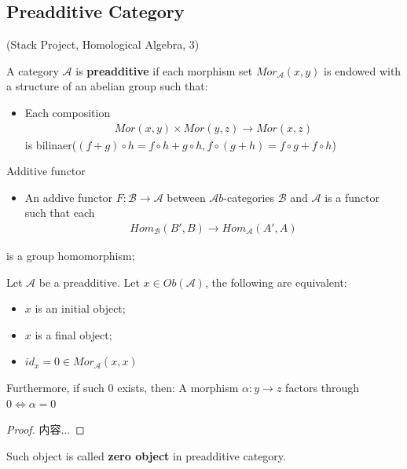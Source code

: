 \documentclass[Total.tex]{subfiles}
\begin{document}
			\subsection{Preadditive Category}
				(Stack Project, Homological Algebra, 3)
				\begin{Def}
					A category $\mathcal{A}$ is \textbf{preadditive} if each morphism set $Mor_\mathcal{A}(x,y)$ is endowed with a structure of an abelian group such that:
					\begin{itemize}
						\item  Each composition
						\begin{gather*}
							Mor(x,y)\times Mor(y,z)\rightarrow Mor(x,z)
						\end{gather*}
						is bilinaer($(f+g)\circ h=f\circ h+g\circ h,f\circ (g+h)=f\circ g+f\circ h$)
					\end{itemize}
				\end{Def}
				Additive functor
				\begin{Def}
					\begin{itemize}
						\item An addive functor $F:\mathcal{B}\rightarrow \mathcal{A}$ between $\mathcal Ab$-categories $\mathcal{B}$ and $\mathcal{A}$ is a functor such that each
						\begin{gather*}
							Hom_\mathcal{B}(B',B)\rightarrow Hom_{\mathcal{A}}(A',A)
						\end{gather*}
					\end{itemize}
					is a group homomorphism;
				\end{Def}
				\begin{lemma}
					Let $\mathcal{A}$ be a preadditive. Let $x\in Ob(\mathcal{A})$, the following are equivalent:
					\begin{itemize}
						\item $x$ is an initial object;
						\item $x$ is a final object;
						\item $id_x=0\in Mor_\mathcal{A}(x,x)$
					\end{itemize}
					Furthermore, if such $0$ exists, then: A morphism $\alpha:y\rightarrow z$ factors through $0\Leftrightarrow \alpha=0$
				\end{lemma}
				\begin{proof}
					内容...
				\end{proof}
				Such object is called \textbf{zero object} in preadditive category.
				
\end{document}
